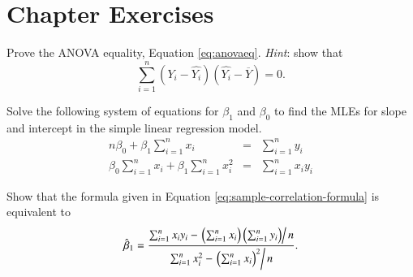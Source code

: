 \documentclass[captions=tableheading]{scrbook}
\begin{document}
\newpage{}
\section{Chapter Exercises}
\label{sec-1-6}


\setcounter{thm}{0}

\begin{xca}
Prove the ANOVA equality, Equation \ref{eq:anovaeq}. \emph{Hint}:
show that
\[
\sum_{i=1}^{n}(Y_{i}-\hat{Y_{i}})(\hat{Y_{i}}-\overline{Y})=0.
\]
\end{xca}

\begin{xca}
\label{xca:find-mles-SLR}
Solve the following system of equations for \(\beta_{1}\) and \(\beta_{0}\) to find the MLEs for slope and intercept in the simple linear regression model.
\begin{eqnarray*}
n\beta_{0}+\beta_{1}\sum_{i=1}^{n}x_{i} & = & \sum_{i=1}^{n}y_{i}\\
\beta_{0}\sum_{i=1}^{n}x_{i}+\beta_{1}\sum_{i=1}^{n}x_{i}^{2} & = & \sum_{i=1}^{n}x_{i}y_{i}
\end{eqnarray*}
\end{xca}

\begin{xca}
\label{xca:show-alternate-slope-formula}
Show that the formula given in Equation \ref{eq:sample-correlation-formula} is equivalent to
\[
\hat{\beta}_{1} = \frac{\sum_{i=1}^{n}x_{i}y_{i}-\left.\left(\sum_{i=1}^{n}x_{i}\right)\left(\sum_{i=1}^{n}y_{i}\right)\right\slash n}{\sum_{i=1}^{n}x_{i}^{2}-\left.\left(\sum_{i=1}^{n}x_{i}\right)^{2}\right\slash n}.
\]
\end{xca}
\end{document}
